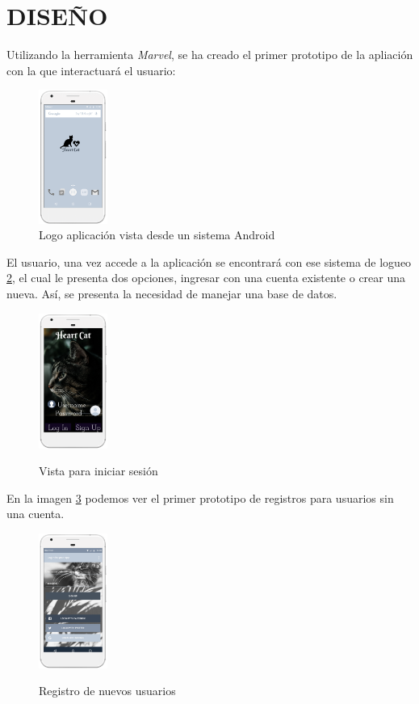 \documentclass[letterpaper, 10 pt, conference]{ieeeconf}  %
\begin{document}
   
\section{DISE\~NO}

Utilizando la herramienta \textit{Marvel}, se ha creado el primer prototipo de la apliaci\'on con la que interactuar\'a el usuario:

\begin{figure}
\centering
\includegraphics[width=0.2\textwidth]{hc1.png}
\caption{Logo aplicaci\'on vista desde un sistema Android}
\label{fig:home}
\end{figure}

El usuario, una vez accede a la aplicaci\'on se encontrar\'a con ese sistema de logueo \ref{fig:login}, el cual le presenta dos opciones, ingresar con una cuenta existente o crear una nueva. As\'i, se presenta la necesidad de manejar una base de datos.\\

\begin{figure}
\centering
\includegraphics[width=0.2\textwidth]{hc2.png}
\label{fig:login}
\caption{Vista para iniciar sesi\'on}
\end{figure}

En la imagen \ref{fig:signup} podemos ver el primer prototipo de registros para usuarios sin una cuenta.\\

\begin{figure}
\centering
\includegraphics[width=0.2\textwidth]{hc3.PNG}
\label{fig:signup}
\caption{Registro de nuevos usuarios}
\end{figure}
\end{document}
